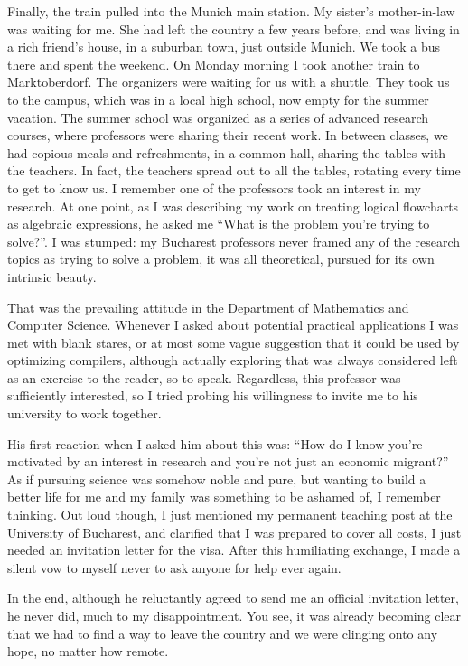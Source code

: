 \documentclass[12pt]{book}
\begin{document}
Finally, the train pulled into the Munich main station. My sister's
mother-in-law was waiting for me. She had left the country a few years
before, and was living in a rich friend's house, in a suburban town,
just outside Munich. We took a bus there and spent the weekend. On
Monday morning I took another train to Marktoberdorf. The organizers
were waiting for us with a shuttle. They took us to the campus, which
was in a local high school, now empty for the summer vacation. The
summer school was organized as a series of advanced research courses,
where professors were sharing their recent work. In between classes, we
had copious meals and refreshments, in a common hall, sharing the tables
with the teachers. In fact, the teachers spread out to all the tables,
rotating every time to get to know us. I remember one of the professors
took an interest in my research. At one point, as I was describing my
work on treating logical flowcharts as algebraic expressions, he asked
me ``What is the problem you're trying to solve?''. I was stumped: my
Bucharest professors never framed any of the research topics as trying
to solve a problem, it was all theoretical, pursued for its own
intrinsic beauty.

That was the prevailing attitude in the Department of Mathematics and
Computer Science. Whenever I asked about potential practical
applications I was met with blank stares, or at most some vague
suggestion that it could be used by optimizing compilers, although
actually exploring that was always considered left as an exercise to the
reader, so to speak. Regardless, this professor was sufficiently
interested, so I tried probing his willingness to invite me to his
university to work together.

His first reaction when I asked him about this was: ``How do I know
you're motivated by an interest in research and you're not just an
economic migrant?'' As if pursuing science was somehow noble and pure,
but wanting to build a better life for me and my family was something to
be ashamed of, I remember thinking. Out loud though, I just mentioned my
permanent teaching post at the University of Bucharest, and clarified
that I was prepared to cover all costs, I just needed an invitation
letter for the visa. After this humiliating exchange, I made a silent
vow to myself never to ask anyone for help ever again.

In the end, although he reluctantly agreed to send me an official
invitation letter, he never did, much to my disappointment. You see, it
was already becoming clear that we had to find a way to leave the
country and we were clinging onto any hope, no matter how remote.
\end{document}
